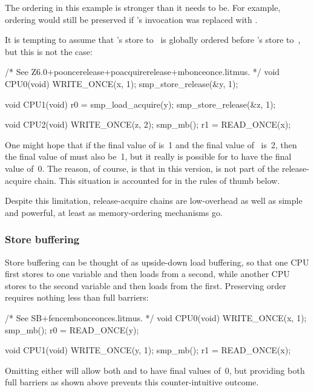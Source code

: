 The ordering in this example is stronger than it needs to be.
For example, ordering would still be preserved if 's
 invocation was replaced with .

It is tempting to assume that 's store to~ is globally ordered
before 's store to~, but this is not the case:

\begin{VerbatimU}
	/* See Z6.0+pooncerelease+poacquirerelease+mbonceonce.litmus. */
	void CPU0(void)
	{
		WRITE_ONCE(x, 1);
		smp_store_release(&y, 1);
	}

	void CPU1(void)
	{
		r0 = smp_load_acquire(y);
		smp_store_release(&z, 1);
	}

	void CPU2(void)
	{
		WRITE_ONCE(z, 2);
		smp_mb();
		r1 = READ_ONCE(x);
	}
\end{VerbatimU}

One might hope that if the final value of  is~1 and the final value
of~ is~2, then the final value of  must also be~1, but it
really is possible for  to have the final value of~0.
The reason, of course, is that in this version,  is not part
of the release-acquire chain.
This situation is accounted for in the rules of thumb below.

Despite this limitation, release-acquire chains are low-overhead as
well as simple and powerful, at least as memory-ordering mechanisms go.


\subsubsection{Store buffering}

Store buffering can be thought of as upside-down load buffering, so
that one CPU first stores to one variable and then loads from a second,
while another CPU stores to the second variable and then loads from the
first.
Preserving order requires nothing less than full barriers:

\begin{VerbatimU}
	/* See SB+fencembonceonces.litmus. */
	void CPU0(void)
	{
		WRITE_ONCE(x, 1);
		smp_mb();
		r0 = READ_ONCE(y);
	}

	void CPU1(void)
	{
		WRITE_ONCE(y, 1);
		smp_mb();
		r1 = READ_ONCE(x);
	}
\end{VerbatimU}

Omitting either  will allow both  and  to have final
values of~0, but providing both full barriers as shown above prevents
this counter-intuitive outcome.

